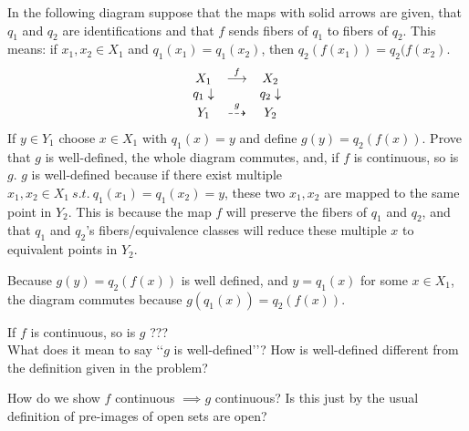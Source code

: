 \documentclass{jhwhw}
\begin{document}
\problem{} %
\noindent
In the following diagram suppose that the maps with solid arrows are given, that $q_1$ and $q_2$ are identifications and that $f$ sends fibers of $q_1$ to fibers of $q_2$.  This means:   if $x_1,x_2\in X_1$ and $q_1(x_1) = q_1(x_2)$, then $q_2(f(x_1)) = q_2(f(x_2)$.
\begin{eqnarray*}
	\begin{array}{ccc}
		X_1 & \buildrel f \over\longrightarrow & X_2 \\
		{q_1}\downarrow &  & {q_2}\downarrow\\
		Y_1 & \buildrel g \over\dashrightarrow & Y_2
	\end{array}
\end{eqnarray*}
If $y\in Y_1$ choose  $x\in X_1$ with $q_1(x) = y$ and define $g(y) = q_2(f(x))$.  Prove that $g$ is well-defined, the whole diagram commutes, and, if $f$ is continuous, so is $g$.
\solution{}
\noindent
$g$ is well-defined because if there exist multiple $x_1, x_2 \in X_1\ s.t.\ q_1(x_1)=q_1(x_2)=y$, these two $x_1, x_2$ are mapped to the same point in $Y_2$. This is because the map $f$ will preserve the fibers of $q_1$ and $q_2$, and that $q_1$ and $q_2$'s fibers/equivalence classes will reduce these multiple $x$ to equivalent points in $Y_2$.

Because $g(y) = q_2(f(x))$ is well defined, and $y=q_1(x)$ for some $x\in X_1$, the diagram commutes because $g(q_1(x)) = q_2(f(x))$.

If $f$ is continuous, so is $g$ ???
\\

What does it mean to say \lq\lq $g$ is well-defined\rq\rq ? How is well-defined different from the definition given in the problem?

How do we show $f$ continuous $\implies g$ continuous? Is this just by the usual definition of pre-images of open sets are open?
\end{document}
